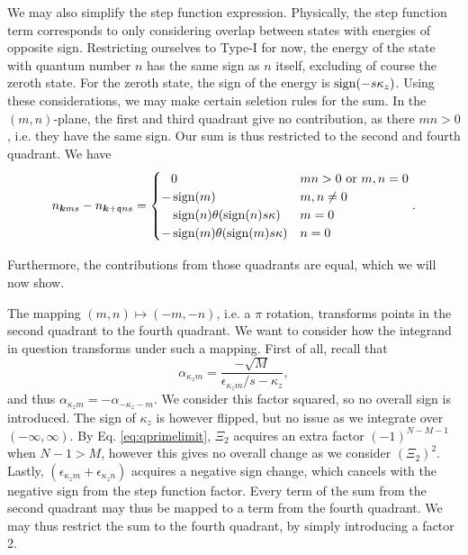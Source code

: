 We may also simplify the step function expression.
Physically, the step function term corresponds to only considering overlap between states with energies of opposite sign.
Restricting ourselves to Type-I for now, the energy of the state with quantum number \( n \) has the same sign as \( n \) itself, excluding of course the zeroth state.
For the zeroth state, the sign of the energy is \( \operatorname{sign}(-s \kappa_z) \).
Using these considerations, we may make certain seletion rules for the sum.
In the \( (m,n) \)-plane, the first and third quadrant give no contribution, as there \( m n > 0 \), i.e. they have the same sign.
Our sum is thus restricted to the second and fourth quadrant.
We have
\begin{equation}
  \label{eq:93}
  n_{\bm{k} m s} - n_{\bm{k} + \mathfrak{q} n s} =
  \begin{cases}
    \phantom{-} 0 & m n > 0 \text{ or  } m,n = 0\\
    - \operatorname{sign}(m) & m,n \neq 0\\
    \phantom{-} \operatorname{sign}(n) \theta(\operatorname{sign}(n) s \kappa) & m = 0\\
    -\operatorname{sign}(m) \theta(\operatorname{sign}(m) s \kappa) & n = 0
  \end{cases}.
\end{equation}

\newpage
Furthermore, the contributions from those quadrants are equal, which we will now show.

The mapping \( (m,n) \mapsto (-m, -n) \), i.e. a \( \pi \) rotation, transforms points in the second quadrant to the fourth quadrant.
We want to consider how the integrand in question transforms under such a mapping.
First of all, recall that
\[
\alpha _{\kappa _z m} = \frac{-\sqrt{M} }{ \epsilon_{\kappa_z m} /s - \kappa _z},
\]
and thus \( \alpha _{\kappa _z m} = -\alpha _{-\kappa _z -m} \).
We consider this factor squared, so no overall sign is introduced.
The sign of \( \kappa_z  \) is however flipped, but no issue as we integrate over \( (-\infty, \infty) \).
By Eq. \eqref{eq:qprimelimit}, \( \Xi _2 \) acquires an extra factor \( (-1)^{N-M-1} \) when \( N-1 > M \), however this gives no overall change as we consider \( (\Xi_2) ^2 \).
Lastly, \( (\epsilon_{\kappa _z m} + \epsilon_{\kappa _z n}) \) acquires a negative sign change, which cancels with the negative sign from the step function factor.
Every term of the sum from the second quadrant may thus be mapped to a term from the fourth quadrant.
We may thus restrict the sum to the fourth quadrant, by simply introducing a factor 2.


